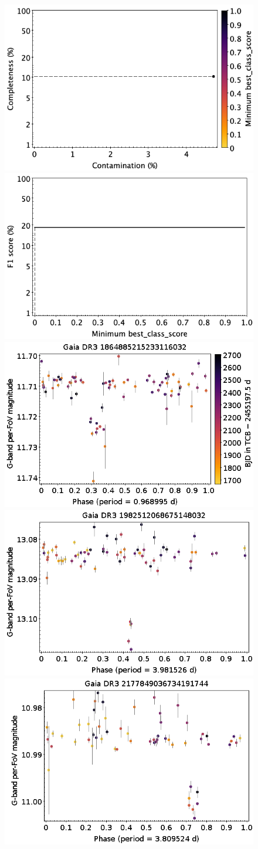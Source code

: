 \documentclass[longauth]{aa}
\begin{document}
\begin{appendix}
\begin{figure}
\centering
{} \includegraphics[width=0.45\hsize]{figures/appendix/EP_cls_scc.png}  
\hspace{2mm}
 \includegraphics[width=0.45\hsize]{figures/appendix/EP_cls_sf1.png} \\ 
\vspace{4mm}
 \includegraphics[width=0.45\hsize]{figures/appendix/EP-32.png}  
\hspace{2mm}
 \includegraphics[width=0.45\hsize]{figures/appendix/EP-35.png} \\
\vspace{4mm}
 \includegraphics[width=0.45\hsize]{figures/appendix/EP-49.png}  

\end{figure}
\end{appendix}
\end{document}
